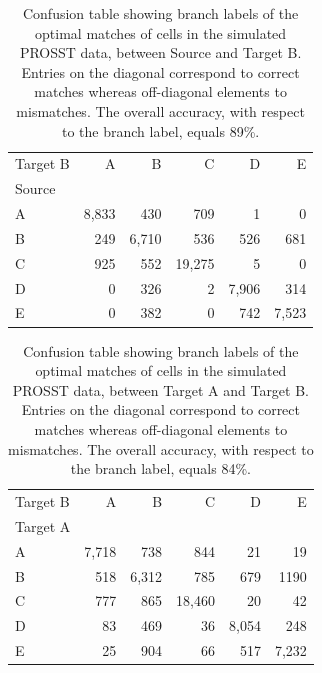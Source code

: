 \begin{table}[ht]
\centering
\begin{tabular}{lrrrrr}
\toprule
Target B &     A &     B &      C &     D &     E \\
Source &       &       &        &       &       \\
\midrule
A      &  8,833 &   430 &    709 &     1 &     0 \\
B      &   249 &  6,710 &    536 &   526 &   681 \\
C      &   925 &   552 &  19,275 &     5 &     0 \\
D      &     0 &   326 &      2 &  7,906 &   314 \\
E      &     0 &   382 &      0 &   742 &  7,523 \\
\bottomrule
\end{tabular}
\caption{Confusion table showing branch labels of the optimal matches of cells in the simulated PROSST data, between Source and Target B. Entries on the diagonal correspond to correct matches whereas off-diagonal elements to mismatches. The overall accuracy, with respect to the branch label, equals 89\%.}
\label{tbl:prosstt_conf_SB}
\end{table}

\begin{table}
\centering
\begin{tabular}{lrrrrr}
\toprule
Target B &     A &     B &      C &     D &     E \\
Target A &       &       &        &       &       \\
\midrule
A      &  7,718 &   738 &    844 &    21 &    19 \\
B      &   518 &  6,312 &    785 &   679 &  1190 \\
C      &   777 &   865 &  18,460 &    20 &    42 \\
D      &    83 &   469 &     36 &  8,054 &   248 \\
E      &    25 &   904 &     66 &   517 &  7,232 \\
\bottomrule
\end{tabular}
\caption{Confusion table showing branch labels of the optimal matches of cells in the simulated PROSST data, between Target A and Target B. Entries on the diagonal correspond to correct matches whereas off-diagonal elements to mismatches. The overall accuracy, with respect to the branch label, equals 84\%.}
\label{tbl:prosstt_conf_AB}
\end{table}


